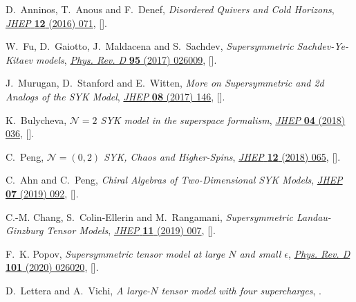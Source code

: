 \begin{thebibliography}{10}
D.~Anninos, T.~Anous and F.~Denef, \emph{{Disordered Quivers and Cold
  Horizons}}, \href{http://dx.doi.org/10.1007/JHEP12(2016)071}{\emph{JHEP}
  {\bfseries 12} (2016) 071},
  [\href{https://arxiv.org/abs/1603.00453}{{}}].

W.~Fu, D.~Gaiotto, J.~Maldacena and S.~Sachdev, \emph{{Supersymmetric
  Sachdev-Ye-Kitaev models}},
  \href{http://dx.doi.org/10.1103/PhysRevD.95.026009}{\emph{Phys. Rev. D}
  {\bfseries 95} (2017) 026009},
  [\href{https://arxiv.org/abs/1610.08917}{{}}].

J.~Murugan, D.~Stanford and E.~Witten, \emph{{More on Supersymmetric and 2d
  Analogs of the SYK Model}},
  \href{http://dx.doi.org/10.1007/JHEP08(2017)146}{\emph{JHEP} {\bfseries 08}
  (2017) 146}, [\href{https://arxiv.org/abs/1706.05362}{{}}].

K.~Bulycheva, \emph{{$ \mathcal{N}=2 $ SYK model in the superspace formalism}},
  \href{http://dx.doi.org/10.1007/JHEP04(2018)036}{\emph{JHEP} {\bfseries 04}
  (2018) 036}, [\href{https://arxiv.org/abs/1801.09006}{{}}].

C.~Peng, \emph{{$\mathcal{N}=(0,2)$ SYK, Chaos and Higher-Spins}},
  \href{http://dx.doi.org/10.1007/JHEP12(2018)065}{\emph{JHEP} {\bfseries 12}
  (2018) 065}, [\href{https://arxiv.org/abs/1805.09325}{{}}].

C.~Ahn and C.~Peng, \emph{{Chiral Algebras of Two-Dimensional SYK Models}},
  \href{http://dx.doi.org/10.1007/JHEP07(2019)092}{\emph{JHEP} {\bfseries 07}
  (2019) 092}, [\href{https://arxiv.org/abs/1812.05106}{{}}].

C.-M. Chang, S.~Colin-Ellerin and M.~Rangamani, \emph{{Supersymmetric
  Landau-Ginzburg Tensor Models}},
  \href{http://dx.doi.org/10.1007/JHEP11(2019)007}{\emph{JHEP} {\bfseries 11}
  (2019) 007}, [\href{https://arxiv.org/abs/1906.02163}{{}}].

F.~K. Popov, \emph{{Supersymmetric tensor model at large $N$ and small
  $\epsilon$}},
  \href{http://dx.doi.org/10.1103/PhysRevD.101.026020}{\emph{Phys. Rev. D}
  {\bfseries 101} (2020) 026020},
  [\href{https://arxiv.org/abs/1907.02440}{{}}].

D.~Lettera and A.~Vichi, \emph{{A large-$N$ tensor model with four
  supercharges}},  \href{https://arxiv.org/abs/2012.11600}{{}}.


\end{thebibliography}
